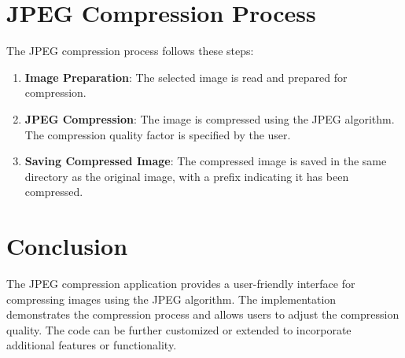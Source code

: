 \documentclass[a4paper,12pt]{article}
\begin{document}
\section{JPEG Compression Process}
The JPEG compression process follows these steps:

\begin{enumerate}
  \item \textbf{Image Preparation}: The selected image is read and prepared for compression.
  
  \item \textbf{JPEG Compression}: The image is compressed using the JPEG algorithm. The compression quality factor is specified by the user.
  
  \item \textbf{Saving Compressed Image}: The compressed image is saved in the same directory as the original image, with a prefix indicating it has been compressed.
\end{enumerate}

\section{Conclusion}
The JPEG compression application provides a user-friendly interface for compressing images using the JPEG algorithm. The implementation demonstrates the compression process and allows users to adjust the compression quality. The code can be further customized or extended to incorporate additional features or functionality.
\end{document}
